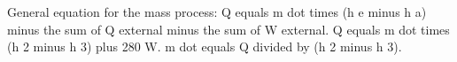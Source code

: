 General equation for the mass process:  
Q equals m dot times (h e minus h a) minus the sum of Q external minus the sum of W external.  
Q equals m dot times (h 2 minus h 3) plus 280 W.  
m dot equals Q divided by (h 2 minus h 3).